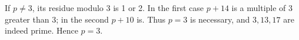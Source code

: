 If $p\ne3$, its residue modulo 3 is 1 or 2. In the first case $p+14$ is a multiple of 3 greater than 3; in the second $p+10$ is. Thus $p=3$ is necessary, and $3,13,17$ are indeed prime. Hence $\boxed{p=3}$.
